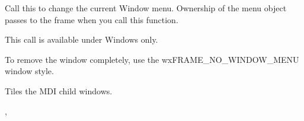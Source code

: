 Call this to change the current Window menu. Ownership of the menu object passes to
the frame when you call this function.

This call is available under Windows only.

To remove the window completely, use the wxFRAME\_NO\_WINDOW\_MENU window style.

\label{wxmdiparentframetile}


Tiles the MDI child windows.


,\rtfsp
{}


